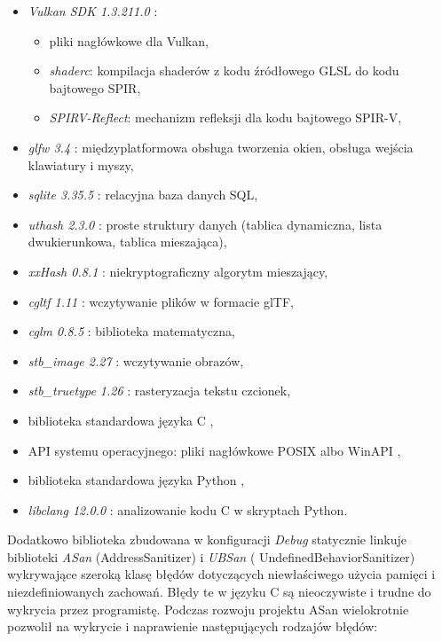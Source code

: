 \begin{itemize}
	\item {\textit{Vulkan SDK 1.3.211.0}} \cite{VULKANSDK}:
	\begin{itemize}
		\item pliki nagłówkowe dla Vulkan,
		\item \textit{shaderc}: kompilacja shaderów z kodu źródłowego GLSL do kodu bajtowego SPIR,
		\item \textit{SPIRV-Reflect}: mechanizm refleksji dla kodu bajtowego SPIR-V,
	\end{itemize}
	\item {\textit{glfw 3.4}} \cite{GLFW}: międzyplatformowa obsługa tworzenia okien, obsługa wejścia klawiatury i myszy,
	\item {\textit{sqlite 3.35.5}} \cite{SQLITE}: relacyjna baza danych SQL,
	\item {\textit{uthash 2.3.0}} \cite{UTHASH}: proste struktury danych (tablica dynamiczna, lista dwukierunkowa, tablica mieszająca),
	\item {\textit{xxHash 0.8.1}} \cite{XXHASH}: niekryptograficzny algorytm mieszający,
	\item {\textit{cgltf 1.11}} \cite{CGLTF}: wczytywanie plików w formacie glTF,
	\item {\textit{cglm 0.8.5}} \cite{CGLM}: biblioteka matematyczna,
	\item {\textit{stb\_image 2.27}} \cite{STB}: wczytywanie obrazów,
	\item {\textit{stb\_truetype 1.26}} \cite{STB}: rasteryzacja tekstu czcionek,
	\item {biblioteka standardowa języka C} \cite{C11REFERENCE},
	\item {API systemu operacyjnego}: pliki nagłówkowe POSIX \cite{POSIXREFERENCE} albo WinAPI \cite{WINAPIREFERENCE},
	\item {biblioteka standardowa języka Python \cite{PYTHONREFERENCE}},
	\item {\textit{libclang 12.0.0}} \cite{LIBCLANG}: analizowanie kodu C w skryptach Python.
\end{itemize}

Dodatkowo biblioteka zbudowana w konfiguracji \textit{Debug} statycznie linkuje biblioteki \textit{ASan} (AddressSanitizer) i \textit{UBSan} (
UndefinedBehaviorSanitizer) wykrywające szeroką klasę błędów dotyczących niewłaściwego użycia pamięci i niezdefiniowanych zachowań. Błędy te w języku C są nieoczywiste i trudne do wykrycia przez programistę. Podczas rozwoju projektu ASan wielokrotnie pozwolił na wykrycie i naprawienie następujących rodzajów błędów:

